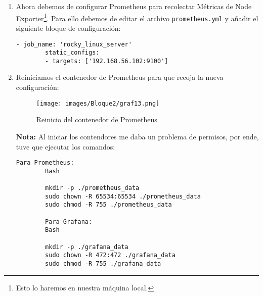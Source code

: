 \begin{enumerate}
\begin{enumerate}
    \end{enumerate}
    \item Ahora debemos de configurar Prometheus para recolectar Métricas de Node Exporter\footnote{Esto lo haremos en nuestra máquina local.}. Para ello debemos de editar el archivo \texttt{prometheus.yml} y añadir el siguiente bloque de configuración:
    \begin{lstlisting}[style=customstyle]
        - job_name: 'rocky_linux_server'
        static_configs:
        - targets: ['192.168.56.102:9100'] 
    \end{lstlisting}
    \item Reiniciamos el contenedor de Prometheus para que recoja la nueva configuración:
    \begin{figure}[H]
        \centering
        \texttt{[image: images/Bloque2/graf13.png]}
        \caption{Reinicio del contenedor de Prometheus}
        \label{fig:reinicio}
    \end{figure}
    \textbf{Nota:} Al iniciar los contendores me daba un problema de permisos, por ende, tuve que ejecutar los comandos: 
    \begin{lstlisting}[style=customstyle]
        Para Prometheus:
        Bash

        mkdir -p ./prometheus_data
        sudo chown -R 65534:65534 ./prometheus_data
        sudo chmod -R 755 ./prometheus_data

        Para Grafana:
        Bash

        mkdir -p ./grafana_data
        sudo chown -R 472:472 ./grafana_data
        sudo chmod -R 755 ./grafana_data
    \end{lstlisting}


\end{enumerate}
